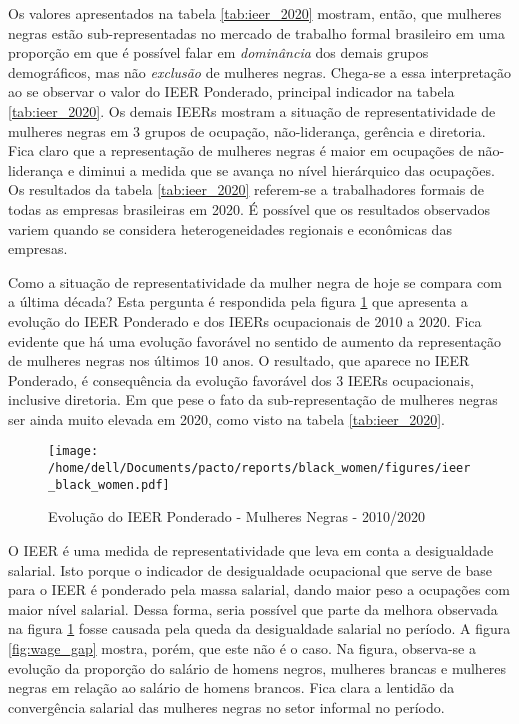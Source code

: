 \documentclass[12pt]{article}
\begin{document}
\par Os valores apresentados na tabela \ref{tab:ieer_2020} mostram, então, que mulheres negras estão sub-representadas no mercado de trabalho formal brasileiro em uma proporção em que é possível falar em \textit{dominância} dos demais grupos de\-mo\-grá\-fi\-cos, mas não \textit{exclusão} de mulheres negras. Chega-se a essa interpretação ao se observar o valor do IEER Ponderado, principal indicador na tabela \ref{tab:ieer_2020}. Os demais IEERs mostram a situação de representatividade de mulheres negras em 3 grupos de ocupação, não-liderança, gerência e diretoria. Fica claro que a representação de mulheres negras é maior em ocupações de não-liderança e diminui a medida que se avança no nível hierárquico das ocupações. Os resultados da tabela \ref{tab:ieer_2020} referem-se a trabalhadores formais de todas as empresas brasileiras em 2020. É possível que os resultados observados variem quando se considera heterogeneidades regionais e econômicas das empresas.



\par Como a situação de representatividade da mulher negra de hoje se compara com a última década? Esta pergunta é respondida pela figura \ref{fig:ieer_evolution} que apresenta a evolução do IEER Ponderado e dos IEERs ocupacionais de 2010 a 2020. Fica evidente que há uma evolução favorável no sentido de aumento da representação de mulheres negras nos últimos 10 anos. O resultado, que aparece no IEER Ponderado, é consequência da evolução favorável dos 3 IEERs ocupacionais, inclusive diretoria. Em que pese o fato da sub-representação de mulheres negras ser ainda muito elevada em 2020, como visto na tabela \ref{tab:ieer_2020}.

\begin{figure}[H]
    \centering
    \caption{Evolução do IEER Ponderado - Mulheres Negras - 2010/2020}
        \texttt{[image: /home/dell/Documents/pacto/reports/black\_women/figures/ieer\_black\_women.pdf]}
    \label{fig:ieer_evolution}
\end{figure}

\par O IEER é uma medida de representatividade que leva em conta a desigualdade salarial. Isto porque o indicador de desigualdade ocupacional que serve de base para o IEER é ponderado pela massa salarial, dando maior peso a ocupações com maior nível salarial. Dessa forma, seria possível que parte da melhora observada na figura \ref{fig:ieer_evolution} fosse causada pela queda da desigualdade salarial no período. A figura \ref{fig:wage_gap} mostra, porém, que este não é o caso. Na figura, observa-se a evolução da proporção do salário de homens negros, mulheres brancas e mulheres negras em relação ao salário de homens brancos. Fica clara a lentidão da convergência salarial das mulheres negras no setor informal no período.
\end{document}

